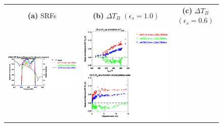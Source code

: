 \begin{figure}[H]
  \centering
  \begin{tabular}{c c c}
    \textsf{\textbf{(a)} SRFs} &
    \textsf{\textbf{(b)} $\Delta T_B$ $(\epsilon_s = 1.0)$} &
    \textsf{\textbf{(c)} $\Delta T_B$ $(\epsilon_s = 0.6)$} \\
    \includegraphics[bb=80 400 280 558,clip,scale=0.85]{graphics/srf/Tset/atms_npp.ch5.osrf.eps} &
    \includegraphics[bb=85 400 260 558,clip,scale=0.85]{graphics/dtb/Tset/e1.0_r0.0/atms_npp.ch5.dTb.eps} & 

\end{tabular}
\end{figure}
